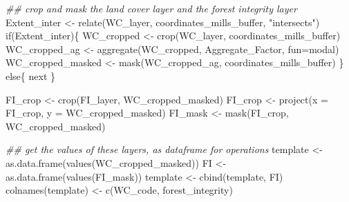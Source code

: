 \documentclass[
  letterpaper,
  DIV=11,
  numbers=noendperiod]{scrartcl}
\newenvironment{Shaded}{\begin{snugshade}}{\end{snugshade}}
\newcommand{\AttributeTok}[1]{\textcolor[rgb]{0.40,0.45,0.13}{#1}}
\newcommand{\ControlFlowTok}[1]{\textcolor[rgb]{0.00,0.23,0.31}{#1}}
\newcommand{\DocumentationTok}[1]{\textcolor[rgb]{0.37,0.37,0.37}{\textit{#1}}}
\newcommand{\FunctionTok}[1]{\textcolor[rgb]{0.28,0.35,0.67}{#1}}
\newcommand{\NormalTok}[1]{\textcolor[rgb]{0.00,0.23,0.31}{#1}}
\newcommand{\OtherTok}[1]{\textcolor[rgb]{0.00,0.23,0.31}{#1}}
\newcommand{\StringTok}[1]{\textcolor[rgb]{0.13,0.47,0.30}{#1}}
\begin{document}
\begin{Shaded}
\begin{Highlighting}[]
    \DocumentationTok{\#\# crop and mask the land cover layer and the forest integrity layer}
\NormalTok{    Extent\_inter }\OtherTok{\textless{}{-}} \FunctionTok{relate}\NormalTok{(WC\_layer, coordinates\_mills\_buffer, }\StringTok{"intersects"}\NormalTok{)}
    \ControlFlowTok{if}\NormalTok{(Extent\_inter)\{}
\NormalTok{    WC\_cropped }\OtherTok{\textless{}{-}} \FunctionTok{crop}\NormalTok{(WC\_layer, coordinates\_mills\_buffer)}
\NormalTok{    WC\_cropped\_ag }\OtherTok{\textless{}{-}} \FunctionTok{aggregate}\NormalTok{(WC\_cropped, Aggregate\_Factor, }\AttributeTok{fun=}\StringTok{\textquotesingle{}modal\textquotesingle{}}\NormalTok{)}
\NormalTok{    WC\_cropped\_masked }\OtherTok{\textless{}{-}} \FunctionTok{mask}\NormalTok{(WC\_cropped\_ag, coordinates\_mills\_buffer)}
\NormalTok{    \} }\ControlFlowTok{else}\NormalTok{\{}
      \ControlFlowTok{next}
\NormalTok{    \}}

\NormalTok{    FI\_crop }\OtherTok{\textless{}{-}} \FunctionTok{crop}\NormalTok{(FI\_layer, WC\_cropped\_masked)}
\NormalTok{    FI\_crop }\OtherTok{\textless{}{-}} \FunctionTok{project}\NormalTok{(}\AttributeTok{x =}\NormalTok{ FI\_crop, }\AttributeTok{y =}\NormalTok{ WC\_cropped\_masked)}
\NormalTok{    FI\_mask }\OtherTok{\textless{}{-}} \FunctionTok{mask}\NormalTok{(FI\_crop, WC\_cropped\_masked)}
    
    \DocumentationTok{\#\# get the values of these layers, as dataframe for operations}
\NormalTok{    template }\OtherTok{\textless{}{-}} \FunctionTok{as.data.frame}\NormalTok{(}\FunctionTok{values}\NormalTok{(WC\_cropped\_masked))}
\NormalTok{    FI }\OtherTok{\textless{}{-}} \FunctionTok{as.data.frame}\NormalTok{(}\FunctionTok{values}\NormalTok{(FI\_mask))}
\NormalTok{    template }\OtherTok{\textless{}{-}} \FunctionTok{cbind}\NormalTok{(template, FI)}
    \FunctionTok{colnames}\NormalTok{(template) }\OtherTok{\textless{}{-}} \FunctionTok{c}\NormalTok{(}\StringTok{\textquotesingle{}WC\_code\textquotesingle{}}\NormalTok{, }\StringTok{\textquotesingle{}forest\_integrity\textquotesingle{}}\NormalTok{)}
    

\end{Highlighting}
\end{Shaded}
\end{document}
